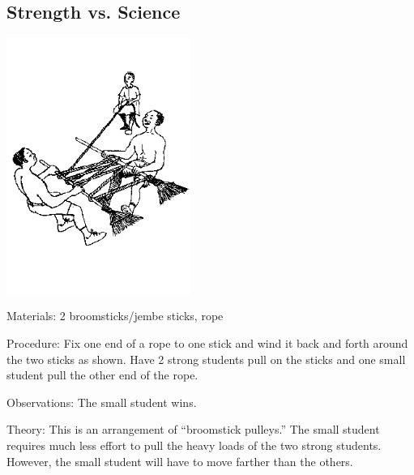 \begin{multicols}{2}
\vfill
\columnbreak

\subsection{Strength vs. Science}

\begin{center}
\includegraphics[width=0.45\textwidth]{./img/source/pulley-strength.png}
\end{center}

\begin{description*}
\item[Materials:]{2 broomsticks/jembe sticks, rope}
\item[Procedure:]{Fix one end of a rope to one stick and wind it back and forth around the two sticks as shown. Have 2 strong students pull on the sticks and one small student pull the other end of the rope.}
\item[Observations:]{The small student wins.}
\item[Theory:]{This is an arrangement of ``broomstick pulleys.'' The small student requires much less effort to pull the heavy loads of the two strong students. However, the small student will have to move farther than the others.}
\end{description*}

\vfill
\columnbreak



\end{multicols}
